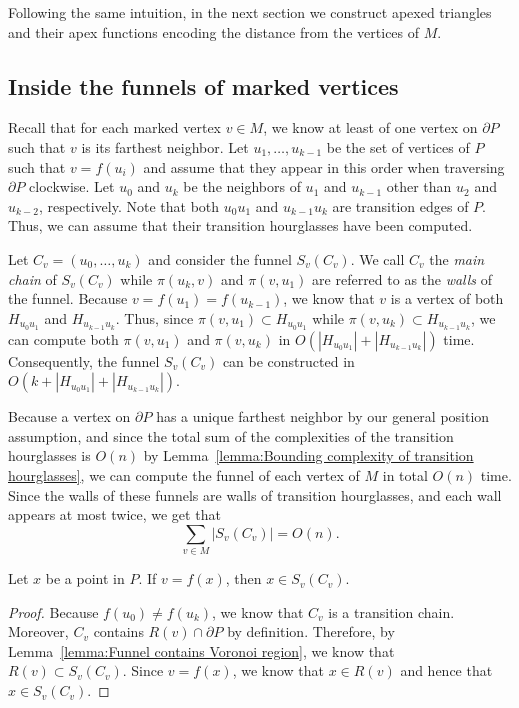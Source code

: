 \documentclass[a4paper,UKenglish]{lipics}
\newcommand{\fn}[2]{\ensuremath{S_{\scriptscriptstyle #1}(#2)}}
\newcommand{\ff}[1]{\ensuremath{f(#1)}}
\newcommand{\p}[2]{\ensuremath{\pi(#1, #2)}}
\begin{document}
Following the same intuition, in the next section we construct apexed triangles and their apex functions encoding the distance from the vertices of $M$.

\subsection{Inside the funnels of marked vertices}
Recall that for each marked vertex $v\in M$, we know at least of one vertex on $\partial P$ such that $v$ is its farthest neighbor.
Let $u_1, \ldots, u_{k-1}$ be the set of vertices of $P$ such that $v = \ff{u_i}$ and assume that they appear in this order when traversing $\partial P$ clockwise. Let $u_0$ and $u_k$ be the neighbors of $u_1$ and $u_{k-1}$ other than $u_2$ and $u_{k-2}$, respectively. Note that both $u_0 u_1$ and $u_{k-1}u_k$ are transition edges of $P$. Thus, we can assume that their transition hourglasses have been computed.

Let $C_v = (u_0, \ldots, u_k)$ and consider the funnel $\fn{v}{C_v}$.
We call $C_v$ the \emph{main chain} of $\fn{v}{C_v}$ while $\p{u_k}{ v}$ and $\p{v}{ u_1}$ are referred to as the \emph{walls} of the funnel.  
Because $v = \ff{u_1} = \ff{u_{k-1}}$, we know that $v$ is a vertex of both $H_{u_0 u_1}$ and  $H_{u_{k-1}u_k}$. 
Thus, since $\p{v}{ u_1}\subset H_{u_0u_1}$ while $\p{v}{u_k}\subset H_{u_{k-1}u_k}$, we can compute both $\p{v}{ u_1}$ and $\p{v}{u_k}$ in $O( |H_{u_0 u_1}| + |H_{u_{k-1}u_k}|)$ time.
Consequently, the funnel $\fn{v}{C_v}$ can be constructed in $O(k + |H_{u_0 u_1}| + |H_{u_{k-1}u_k}|)$. 

Because a vertex on $\partial P$ has a unique farthest neighbor by our general position assumption, and since the total sum of the complexities of the transition hourglasses is $O(n)$ by Lemma~\ref{lemma:Bounding complexity of transition hourglasses}, we can compute the funnel of each vertex of $M$ in total $O(n)$ time. 
Since the walls of these funnels are walls of transition hourglasses, and each wall appears at most twice, we get that $$\sum_{v\in M} |\fn{v}{C_v}|  = O(n).$$

\begin{lemma}\label{lemma:Farthest points from marked are in funnel}
Let $x$ be a point in $P$. If $v = \ff{x}$, then $x\in \fn{v}{C_v}$.
\end{lemma}
\begin{proof}
Because $\ff{u_0} \neq \ff{u_k}$, we know that $C_v$ is a transition chain. Moreover, $C_v$ contains $R(v)\cap \partial P$ by definition. Therefore, by Lemma~\ref{lemma:Funnel contains Voronoi region}, we know that $R(v)\subset \fn{v}{C_v}$.
Since $v = \ff{x}$, we know that $x\in R(v)$ and hence that $x \in \fn{v}{C_v}$. 
\end{proof}
\end{document}
